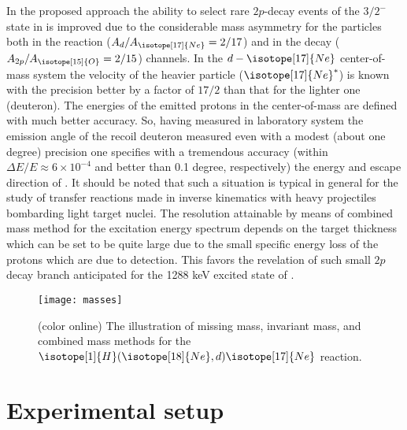 \documentclass[superscriptaddress,showpacs,showkeys,twoside,floatfix,twocolumn]
{revtex4-1}
\begin{document}
In the proposed approach the ability to select rare $2p$-decay events of
the $3/2^-$ state in  is improved due to the
considerable mass asymmetry for the particles both in the reaction
($A_d/A_{\isotope[17]{Ne}}=2/17$) and in the decay
($A_{2p}/A_{\isotope[15]{O}}=2/15$) channels.
In the $d-\isotope[17]{Ne}$ center-of-mass system the velocity of the
heavier particle ($\isotope[17]{Ne}^*$) is known with the precision better by
a factor of $17/2$ than that for the lighter one (deuteron).
The energies of the emitted protons in the
 center-of-mass are defined with much better accuracy.
So, having measured in laboratory system the emission angle of the recoil
deuteron measured even with a modest (about one degree)
precision one specifies with a tremendous accuracy
(within $\Delta E/E\approx 6\times10^{-4}$ and better than 0.1 degree, respectively)
the energy and escape direction of .
It should be noted that such a situation is typical in general for the study of
transfer reactions made in inverse kinematics with heavy projectiles bombarding
light target nuclei.
The resolution attainable by means of combined mass method for
the excitation energy spectrum depends on the target thickness which can be set
to be quite large due to the small specific energy loss of the protons which are
due to detection.
This favors the revelation of such small \(2p\) decay branch
anticipated for the 1288 keV excited state of .

\begin{figure}
\begin{center}
\texttt{[image: masses]}
\end{center}
%
\caption{\label{fig:combined} (color online)
  The illustration of missing mass,
  invariant mass, and combined mass methods for the
  \(\isotope[1]{H}(\isotope[18]{Ne},d)\isotope[17]{Ne}\) reaction.}
%
\end{figure}


\section{Experimental setup}

\end{document}
